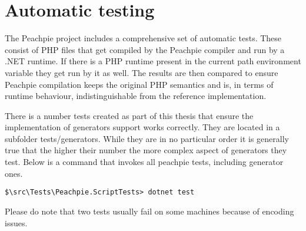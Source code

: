 
\section{Automatic testing}
The Peachpie project includes a comprehensive set of automatic tests. These consist of PHP files that get compiled by the Peachpie compiler and run by a .NET runtime. If there is a PHP runtime present in the current path environment variable they get run by it as well. The results are then compared to ensure Peachpie compilation keeps the original PHP semantics and is, in terms of runtime behaviour, indistinguishable from the reference implementation.

There is a number tests created as part of this thesis that ensure the implementation of generators support works correctly. They are located in a subfolder tests/generators. While they are in no particular order it is generally true that the higher their number the more complex aspect of generators they test. Below is a command that invokes all peachpie tests, including generator ones.

\begin{verbatim}
$\src\Tests\Peachpie.ScriptTests> dotnet test
\end{verbatim}


Please do note that two tests usually fail on some machines because of encoding issues. 








